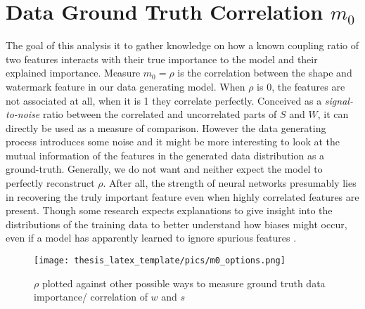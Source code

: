 \section{Data Ground Truth Correlation $m_0$}
The goal of this analysis it to gather knowledge on how a known coupling ratio of two features interacts with their true importance to the model and their explained importance. 
Measure $m_0 = \rho$ is the correlation between the shape and watermark feature in our data generating model. When $\rho$ is 0, the features are not associated at all, when it is 1 they correlate perfectly. Conceived as a \textit{signal-to-noise} ratio between the correlated and uncorrelated parts of $S$ and $W$, it can directly be used as a measure of comparison. However the data generating process introduces some noise and it might be more interesting to look at the mutual information of the features in the generated data distribution as a ground-truth. 
Generally, we do not want and neither expect the model to perfectly reconstruct $\rho$. After all, the strength of neural networks presumably lies in recovering the truly important feature even when highly correlated features are present. Though some research expects explanations to give insight into the distributions of the training data to better understand how biases might occur, even if a model has apparently learned to ignore spurious features \cite{Kindermans2017}. 

\begin{figure}
    \centering
    \texttt{[image: thesis\_latex\_template/pics/m0\_options.png]}
    \caption{$\rho$ plotted against other possible ways to measure ground truth data importance/ correlation of $w$ and $s$}
    \label{fig:finding_rho}
\end{figure}

